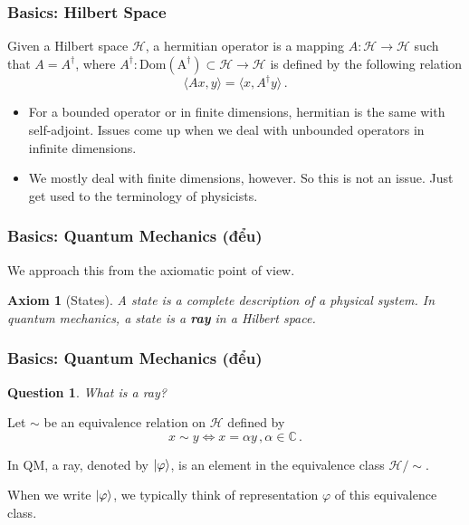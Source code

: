\documentclass[12pt, aspectratio=169]{beamer}
\newtheorem{axiom}{Axiom}
\newtheorem*{question}{Question}
\begin{document}
\begin{frame}
    \frametitle{ Basics: Hilbert Space}
    \begin{definition}
        Given a Hilbert space $\mathcal{H}$,
        a hermitian operator is a mapping $A:\mathcal{H} \to \mathcal{H}$ such that
        $A = A^\dag$, where $A^\dag: \mathrm{Dom(A^\dag)}\subset \mathcal{H} \to \mathcal{H}$ is defined by the following relation
        \begin{equation*}
            \langle A x , y \rangle = \langle x , A^\dag y \rangle \,.
        \end{equation*}
    \end{definition}
    \begin{itemize}
        \item For a bounded operator or in finite dimensions, hermitian is the same with self-adjoint.
    Issues come up when we deal with unbounded operators in  infinite dimensions.
        \item We mostly deal with finite dimensions, however. So this is not an issue. Just get used
    to the terminology of physicists.
    \end{itemize}

\end{frame}

\begin{frame}
\frametitle{Basics: Quantum Mechanics \pause (đểu)}
We approach this from the axiomatic point of view. 

\begin{axiom}[States]
    A state is a complete description of a physical system. 
    In quantum mechanics, a state is a {\bf ray} in a Hilbert space.
\end{axiom}

    
\end{frame}

\begin{frame}
\frametitle{Basics: Quantum Mechanics (đểu)}
\begin{question}
What is a ray?
\end{question}

Let $\sim$ be an equivalence relation on $\mathcal{H}$ defined by
\begin{equation*}
    x\sim y \iff x = \alpha y\,, \alpha \in \mathbb{C}\,.
\end{equation*}

In QM, a ray, denoted by $\ket{\varphi}$, is an element in the equivalence class $\mathcal{H}/\sim$.

    When we write $\ket{\varphi}$, we typically think of representation $\varphi$ of this equivalence class.
\end{frame}
\end{document}

